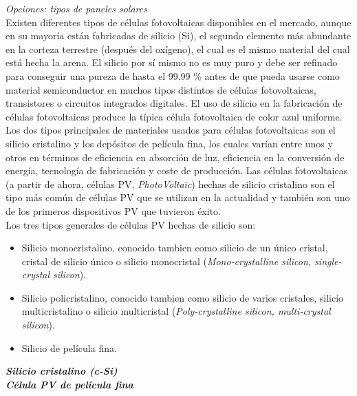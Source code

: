 \documentclass[12pt]{article}
\begin{document}
	\pagebreak
	
	\noindent \textit{Opciones: tipos de paneles solares}\\
	
	\noindent Existen diferentes tipos de células fotovoltaicas disponibles en el mercado, aunque en su mayoría están fabricadas de silicio (Si), el segundo elemento más abundante en la corteza terrestre (después del oxígeno), el cual es el mismo material del cual está hecha la arena. El silicio por sí mismo no es muy puro y debe ser refinado para conseguir una pureza de hasta el 99.99 \% antes de que pueda usarse como material semiconductor en muchos tipos distintos de células fotovoltaicas, transistores o circuitos integrados digitales. El uso de silicio en la fabricación de células fotovoltaicas produce la típica célula fotovoltaica de color azul uniforme. \\
	\noindent Los dos tipos principales de materiales usados para células fotovoltaicas son el silicio cristalino y los depósitos de película fina, los cuales varían entre unos y otros en términos de eficiencia en absorción de luz, eficiencia en la conversión de energía, tecnología de fabricación y coste de producción. Las células fotovoltaicas (a partir de ahora, células PV, \textit{PhotoVoltaic}) hechas de silicio cristalino son el tipo más común de células PV que se utilizan en la actualidad y también son uno de los primeros dispositivos PV que tuvieron éxito.\\
	
	\noindent Los tres tipos generales de células PV hechas de silicio son:\\ 
	
	\begin{itemize}
		\item Silicio monocristalino, conocido tambien como silicio de un único cristal, cristal de silicio único o silicio monocristal (\textit{Mono-crystalline silicon, single-crystal silicon}).
		\item Silicio policristalino, conocido tambien como silicio de varios cristales, silicio multicristalino o silicio multicristal (\textit{Poly-crystalline silicon, multi-crystal silicon}).
		\item Silicio de película fina. \\
	\end{itemize}

	\noindent \textit{\textbf{Silicio cristalino (c-Si)}} \\
	
	\noindent \textit{\textbf{Célula PV de película fina}} \\
	
\end{document}
